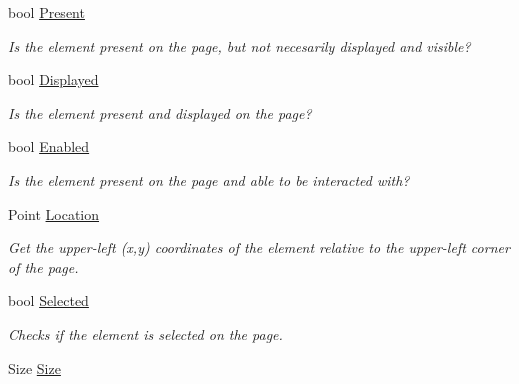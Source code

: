 \begin{DoxyCompactItemize}
\item 
bool \hyperlink{class_proto_test_1_1_golem_1_1_web_driver_1_1_element_adedd809d0baf2f903a8e51fd4f4a4d26}{Present}
\begin{DoxyCompactList}\small\item\em Is the element present on the page, but not necesarily displayed and visible? \end{DoxyCompactList}\item 
bool \hyperlink{class_proto_test_1_1_golem_1_1_web_driver_1_1_element_a186948a50e3f9b07a65be8eb522f4585}{Displayed}
\begin{DoxyCompactList}\small\item\em Is the element present and displayed on the page? \end{DoxyCompactList}\item 
bool \hyperlink{class_proto_test_1_1_golem_1_1_web_driver_1_1_element_ab60ba928770c80ed9d58858b58522785}{Enabled}
\begin{DoxyCompactList}\small\item\em Is the element present on the page and able to be interacted with? \end{DoxyCompactList}\item 
Point \hyperlink{class_proto_test_1_1_golem_1_1_web_driver_1_1_element_a9ac12ce269e1e373fe01f9bc4a1c594a}{Location}
\begin{DoxyCompactList}\small\item\em Get the upper-\/left (x,y) coordinates of the element relative to the upper-\/left corner of the page. \end{DoxyCompactList}\item 
bool \hyperlink{class_proto_test_1_1_golem_1_1_web_driver_1_1_element_a674df76d24ad9569b9c76aaa7f61fe23}{Selected}
\begin{DoxyCompactList}\small\item\em Checks if the element is selected on the page. \end{DoxyCompactList}\item 
Size \hyperlink{class_proto_test_1_1_golem_1_1_web_driver_1_1_element_aa4238f30d0a8b17147135c261b6a4460}{Size}

\end{DoxyCompactItemize}
